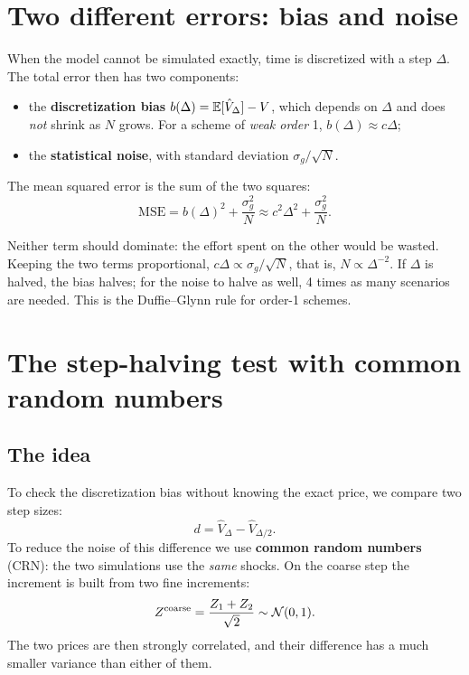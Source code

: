 \section{Two different errors: bias and noise}
When the model cannot be simulated exactly, time is discretized with a step $\Delta$. The total error then has two
components:
\begin{itemize}
\item the \textbf{discretization bias} $b(\Delta)=\mathbb{E}[\hat V_\Delta]-V$, which depends on $\Delta$ and does \emph{not}
shrink as $N$ grows. For a scheme of \emph{weak order} 1, $b(\Delta)\approx c\Delta$;
\item the \textbf{statistical noise}, with standard deviation $\sigma_g/\sqrt N$.
\end{itemize}
The mean squared error is the sum of the two squares:
\begin{equation}\label{eq:mse}
\mathrm{MSE}=b(\Delta)^2+\frac{\sigma_g^2}{N}\approx c^2\Delta^2+\frac{\sigma_g^2}{N}.
\end{equation}

\begin{perche}[title={Why halving the step means quadrupling the scenarios}]
Neither term should dominate: the effort spent on the other would be wasted. Keeping the two terms proportional,
$c\Delta\propto\sigma_g/\sqrt N$, that is, $N\propto\Delta^{-2}$. If $\Delta$ is halved, the bias halves; for the
noise to halve as well, 4 times as many scenarios are needed. This is the Duffie--Glynn rule for order-1 schemes.
\end{perche}

\section{The step-halving test with common random numbers}
\label{sec:halving}
\subsection{The idea}
To check the discretization bias without knowing the exact price, we compare two step sizes:
\[
d=\hat V_\Delta-\hat V_{\Delta/2}.
\]
To reduce the noise of this difference we use \textbf{common random numbers} (CRN): the two simulations use the
\emph{same} shocks. On the coarse step the increment is built from two fine increments:
\[
Z^{\text{coarse}}=\frac{Z_1+Z_2}{\sqrt2}\sim\mathcal{N}(0,1).
\]
The two prices are then strongly correlated, and their difference has a much smaller variance than either of them.

